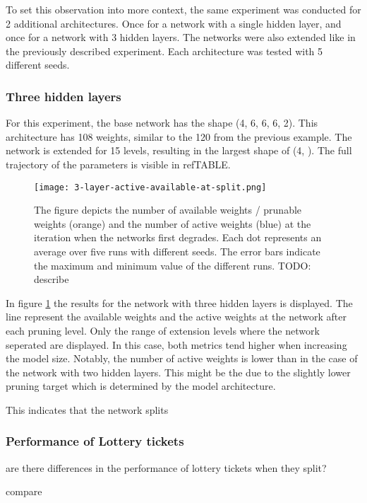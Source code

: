 To set this observation into more context, the same experiment was conducted for 2 additional architectures.
Once for a network with a single hidden layer, and once for a network with 3 hidden layers.
The networks were also extended like in the previously described experiment.
Each architecture was tested with 5 different seeds.

\subsubsection{Three hidden layers}
For this experiment, the base network has the shape (4, 6, 6, 6, 2).
This architecture has 108 weights, similar to the 120 from the previous example.
The network is extended for 15 levels, resulting in the largest shape of (4, ).
The full trajectory of the parameters is visible in refTABLE.

\begin{figure}[ht]
    \centering
    \texttt{[image: 3-layer-active-available-at-split.png]}
    \caption{
        The figure depicts the number of available weights / prunable weights (orange) and the number of active weights (blue) at the iteration when the networks first degrades.
        Each dot represents an average over five runs with different seeds.
        The error bars indicate the maximum and minimum value of the different runs.
        TODO: describe 
    }
    \label{fig:active-split-3layer}
\end{figure}

In figure \ref{fig:active-split-3layer} the results for the network with three hidden layers is displayed. 
The line represent the available weights and the active weights at the network after each pruning level.
Only the range of extension levels where the network seperated are displayed.
In this case, both metrics tend higher when increasing the model size.
Notably, the number of active weights is lower than in the case of the network with two hidden layers.
This might be the due to the slightly lower pruning target which is determined by the model architecture.


This indicates that the network splits 


\subsubsection{Performance of Lottery tickets}
are there differences in the performance of lottery tickets when they split?

compare 